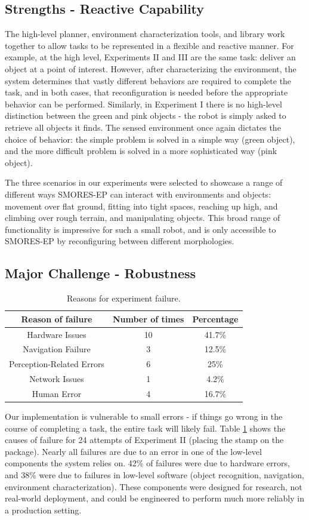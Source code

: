 \documentclass[journal]{IEEEtran}
\begin{document}
\subsection{Strengths - Reactive Capability}
%
The high-level planner, environment characterization tools, and library work together to allow tasks to be represented in a flexible and reactive manner. For example, at the high level, Experiments II and III are the same task: deliver an object at a point of interest.  However, after characterizing the environment, the system determines that vastly different behaviors are required to complete the task, and in both cases, that reconfiguration is needed before the appropriate behavior can be performed. Similarly, in Experiment I there is no high-level distinction between the green and pink objects - the robot is simply asked to retrieve all objects it finds.  The sensed environment once again dictates the choice of behavior: the simple problem is solved in a simple way (green object), and the more difficult problem is solved in a more sophisticated way (pink object).

The three scenarios in our experiments were selected to showcase a range of different ways SMORES-EP can interact with environments and objects: movement over flat ground, fitting into tight spaces, reaching up high, and climbing over rough terrain, and manipulating objects.  This broad range of functionality is impressive for such a small robot, and is only accessible to SMORES-EP by reconfiguring between different morphologies.
%
\subsection{Major Challenge - Robustness}
%
\begin{table}
\centering
\begin{tabular}{|c|c|c|}
\hline
\textbf{Reason of failure} & \textbf{Number of times} & \textbf{Percentage}\\ 
\hline
Hardware Issues & 10 & 41.7\% \\ 
\hline
Navigation Failure & 3 & 12.5\% \\ 
\hline
Perception-Related Errors & 6 & 25\% \\ 
\hline
Network Issues & 1 & 4.2\% \\ 
\hline
Human Error & 4 & 16.7\% \\ 
\hline
\end{tabular}
\caption{Reasons for experiment failure.}
\label{table:errors}
\end{table}
%
Our implementation is vulnerable to small errors - if things go wrong in the course of completing a task, the entire task will likely fail. 
Table \ref{table:errors} shows the causes of failure for 24 attempts of Experiment II (placing the stamp on the package).  
Nearly all failures are due to an error in one of the low-level components the system relies on.
42\% of failures were due to hardware errors, and 38\% were due to failures in low-level software (object recognition, navigation, environment characterization). 
These components were designed for research, not real-world deployment, and could be engineered to perform much more reliably in a production setting.
\end{document}
